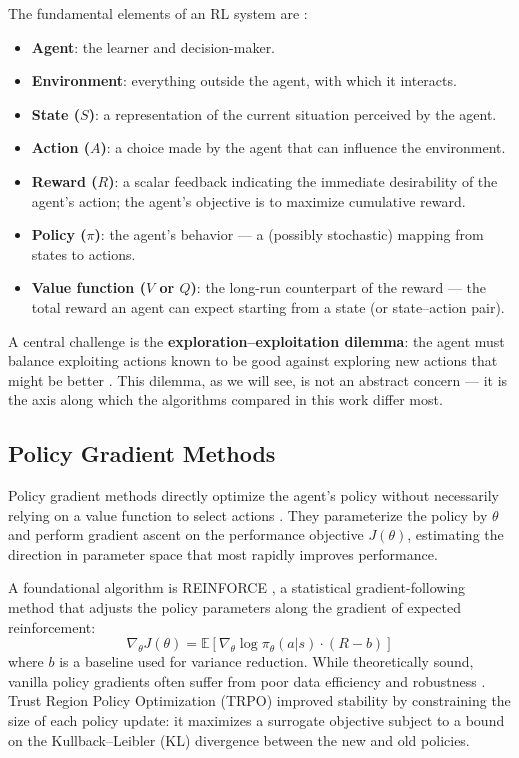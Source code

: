 The fundamental elements of an RL system are \cite{Sutton2018ReinforcementL}:
\begin{itemize}
    \item \textbf{Agent}: the learner and decision-maker.
    \item \textbf{Environment}: everything outside the agent, with which it interacts.
    \item \textbf{State ($S$)}: a representation of the current situation perceived by the agent.
    \item \textbf{Action ($A$)}: a choice made by the agent that can influence the environment.
    \item \textbf{Reward ($R$)}: a scalar feedback indicating the immediate desirability of the agent's action; the agent's objective is to maximize cumulative reward.
    \item \textbf{Policy ($\pi$)}: the agent's behavior --- a (possibly stochastic) mapping from states to actions.
    \item \textbf{Value function ($V$ or $Q$)}: the long-run counterpart of the reward --- the total reward an agent can expect starting from a state (or state--action pair).
\end{itemize}

A central challenge is the \textbf{exploration--exploitation dilemma}: the agent must balance exploiting actions known to be good against exploring new actions that might be better \cite{Sutton2018ReinforcementL}. This dilemma, as we will see, is not an abstract concern --- it is the axis along which the algorithms compared in this work differ most.

\subsection{Policy Gradient Methods}

Policy gradient methods directly optimize the agent's policy without necessarily relying on a value function to select actions \cite{Sutton2018ReinforcementL}. They parameterize the policy by $\theta$ and perform gradient ascent on the performance objective $J(\theta)$, estimating the direction in parameter space that most rapidly improves performance.

A foundational algorithm is REINFORCE \cite{Williams1992Simple}, a statistical gradient-following method that adjusts the policy parameters along the gradient of expected reinforcement:
\begin{equation}
    \nabla_\theta J(\theta) = \mathbb{E}\left[ \nabla_\theta \log \pi_\theta(a|s) \cdot (R - b) \right]
\end{equation}
where $b$ is a baseline used for variance reduction. While theoretically sound, vanilla policy gradients often suffer from poor data efficiency and robustness \cite{Schulman2017ProximalPO}. Trust Region Policy Optimization (TRPO) \cite{Schulman2015TrustRP} improved stability by constraining the size of each policy update: it maximizes a surrogate objective subject to a bound on the Kullback--Leibler (KL) divergence between the new and old policies.

